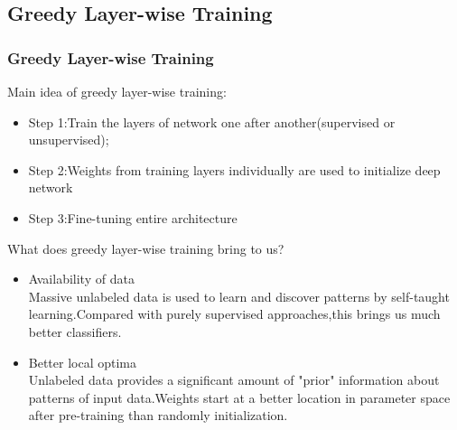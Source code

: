 \documentclass{beamer}
\begin{document}
\begin{CJK*}{UTF8}{gbsn}
\subsection{Greedy Layer-wise Training}
\begin{frame}\frametitle{Greedy Layer-wise Training}
Main idea of greedy layer-wise training:
\begin{itemize}
\item Step 1:Train the layers of network one after another(supervised or unsupervised);
\item Step 2:Weights from training layers individually are used to initialize deep network
\item Step 3:Fine-tuning entire architecture
\end{itemize}
What does greedy layer-wise training bring to us?
\begin{itemize}
 \item Availability of data\\
 Massive unlabeled data is used to learn and discover patterns by self-taught learning.Compared with purely supervised approaches,this brings us much better classifiers.
 \item Better local optima\\
 Unlabeled data provides a significant amount of "prior" information about patterns of input data.Weights start at a better location in parameter space after pre-training than randomly initialization.
\end{itemize}
\end{frame}



\end{CJK*}
\end{document}
